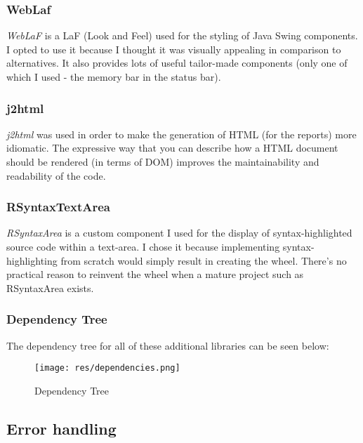 \documentclass[9pt]{article}
\renewenvironment{framed}[1][\hsize]
   {\MakeFramed{\hsize#1\advance\hsize-\width \FrameRestore}}%
   {\endMakeFramed}
\begin{document}
		\subsubsection{WebLaf}
			\textit{WebLaF} is a LaF (Look and Feel) used for the styling of Java Swing
			components. I opted to use it because I thought it was visually
			appealing in comparison to alternatives. It also provides lots of
			useful tailor-made components (only one of which I used - the
			memory bar in the status bar).  

		\subsubsection{j2html}
			\textit{j2html} was used in order to make the generation of HTML
			(for the reports) more idiomatic. The expressive way that you can
			describe how a HTML document should be rendered (in terms of DOM)
			improves the maintainability and readability of the code. 

		\subsubsection{RSyntaxTextArea}
			\textit{RSyntaxArea} is a custom component I used for the display of
			syntax-highlighted source code within a text-area. I chose it
			because implementing syntax-highlighting from scratch would simply
			result in creating the wheel. There's no practical reason to
			reinvent the wheel when a mature project such as RSyntaxArea
			exists.
		
		\subsubsection{Dependency Tree}
			
			The dependency tree for all of these additional libraries can be
			seen below:
			
			\begin{framed}[1.3\textwidth]
				\begin{figure}[H]
					\centering
					\texttt{[image: res/dependencies.png]}
					\caption{Dependency Tree}
				\end{figure}
			\end{framed}

	\subsection{Error handling}
\end{document}
